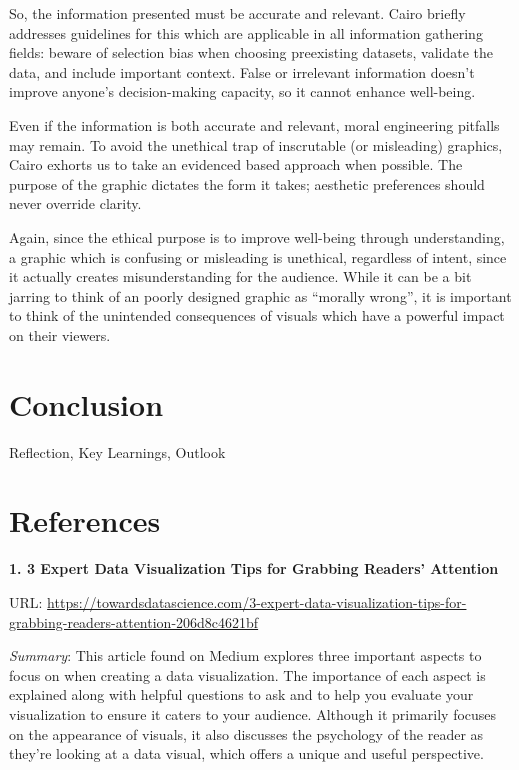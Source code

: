 \documentclass[]{book}
\theoremstyle{definition}
\theoremstyle{definition}
\theoremstyle{definition}
\theoremstyle{remark}
\begin{document}
So, the information presented must be accurate and relevant. Cairo
briefly addresses guidelines for this which are applicable in all
information gathering fields: beware of selection bias when choosing
preexisting datasets, validate the data, and include important context.
False or irrelevant information doesn't improve anyone's decision-making
capacity, so it cannot enhance well-being.

Even if the information is both accurate and relevant, moral engineering
pitfalls may remain. To avoid the unethical trap of inscrutable (or
misleading) graphics, Cairo exhorts us to take an evidenced based
approach when possible. The purpose of the graphic dictates the form it
takes; aesthetic preferences should never override clarity.

Again, since the ethical purpose is to improve well-being through
understanding, a graphic which is confusing or misleading is unethical,
regardless of intent, since it actually creates misunderstanding for the
audience. While it can be a bit jarring to think of an poorly designed
graphic as ``morally wrong'', it is important to think of the unintended
consequences of visuals which have a powerful impact on their viewers.

\chapter{Conclusion}\label{conclusion}

Reflection, Key Learnings, Outlook

\chapter*{References}\label{references-1}

\textbf{1. 3 Expert Data Visualization Tips for Grabbing Readers'
Attention}

URL:
\url{https://towardsdatascience.com/3-expert-data-visualization-tips-for-grabbing-readers-attention-206d8c4621bf}

\emph{Summary}: This article found on Medium explores three important
aspects to focus on when creating a data visualization. The importance
of each aspect is explained along with helpful questions to ask and to
help you evaluate your visualization to ensure it caters to your
audience. Although it primarily focuses on the appearance of visuals, it
also discusses the psychology of the reader as they're looking at a data
visual, which offers a unique and useful perspective.
\end{document}
